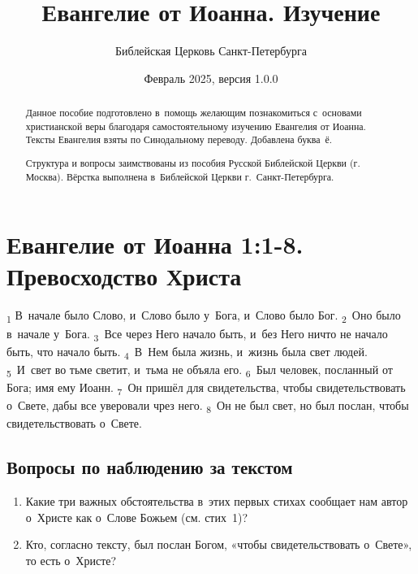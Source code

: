 \documentclass[a4paper,12pt]{article}
\title{Евангелие от Иоанна. Изучение}
\author{Библейская Церковь Санкт-Петербурга}
\date{\small{Февраль 2025, версия 1.0.0}}
\begin{document}
\maketitle

\thispagestyle{empty}

\begin{abstract}
    Данное пособие подготовлено в~помощь желающим познакомиться с~основами христианской веры благодаря самостоятельному изучению Евангелия от Иоанна. Тексты Евангелия взяты по Синодальному переводу. Добавлена буква~ё.
    
    Структура и вопросы заимствованы из пособия Русской Библейской Церкви (г. Москва). Вёрстка выполнена в~Библейской Церкви г.\ Санкт-Петербурга. 
\end{abstract}

\newpage

\tableofcontents


\newcommand{\myline}{\noindent\makebox[\linewidth]{\rule{\linewidth}{0.1pt}}}

\section{Евангелие от Иоанна 1:1-8. Превосходство Христа}

\textsubscript{1} В~начале было Слово, и~Слово было у~Бога, и~Слово было Бог. \textsubscript{2}~Оно было в~начале у~Бога. \textsubscript{3}~Все через Него начало быть, и~без Него ничто не начало быть, что начало быть. \textsubscript{4}~В~Нем была жизнь, и~жизнь была свет людей. \textsubscript{5}~И~свет во тьме светит, и~тьма не объяла его. \textsubscript{6}~Был человек, посланный от Бога; имя ему Иоанн. \textsubscript{7}~Он пришёл для свидетельства, чтобы свидетельствовать о~Свете, дабы все уверовали чрез него. \textsubscript{8}~Он не был свет, но был послан, чтобы свидетельствовать о~Свете.

\subsection*{Вопросы по наблюдению за текстом}
\begin{enumerate}
    \item Какие три важных обстоятельства в~этих первых стихах сообщает нам автор о~Христе как о~Слове Божьем (см. стих~1)? 
    
    \myline

    \myline

    \myline
    
    \item Кто, согласно тексту, был послан Богом, «чтобы свидетельствовать о~Свете», то есть о~Христе?
    
    \myline

\end{enumerate}
\end{document}
